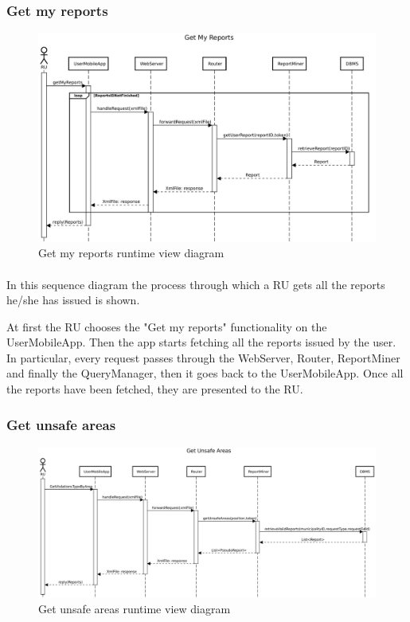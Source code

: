 				\subsubsection{Get my reports}
					\begin{figure}[!h]
						\centering
						\includegraphics[width=\textwidth]{images/DD2/RuntimeView/RU/GetMyReports.pdf}
						\caption{Get my reports runtime view diagram}
					\end{figure}
					\paragraph{}
						In this sequence diagram the process through which a RU gets all the reports he/she has issued is shown.
						
						At first the RU chooses the "Get my reports" functionality on the UserMobileApp. Then the app starts fetching all the reports issued by the user. In particular, every request passes through the WebServer, Router, ReportMiner and finally the QueryManager, then it goes back to the UserMobileApp. Once all the reports have been fetched, they are presented to the RU.
				\clearpage
				\subsubsection{Get unsafe areas}
					\begin{figure}[!h]
						\centering
						\includegraphics[width=\textwidth]{images/DD2/RuntimeView/RU/GetUnsafeAreas.pdf}
						\caption{Get unsafe areas runtime view diagram}
					\end{figure}

